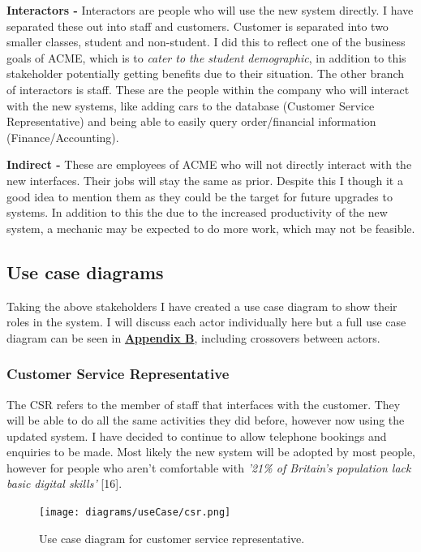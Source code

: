     \noindent\textbf{Interactors -} Interactors are people who will use the new system directly. I have separated these out into staff and customers.
    Customer is separated into two smaller classes, student and non-student. I did this to reflect one of the business goals of ACME, which is to \textit{
    cater to the student demographic}, in addition to this stakeholder potentially getting benefits due to their situation. The other branch of interactors
    is staff. These are the people within the company who will interact with the new systems, like adding cars to the database (Customer Service Representative)
    and being able to easily query order/financial information (Finance/Accounting).

    \vspace{0.2cm}

    \noindent\textbf{Indirect -} These are employees of ACME who will not directly interact with the new interfaces. Their jobs will stay the same as prior. Despite
    this I though it a good idea to mention them as they could be the target for future upgrades to systems. In addition to this the due to the increased 
    productivity of the new system, a mechanic may be expected to do more work, which may not be feasible.

  \subsection{Use case diagrams}
    Taking the above stakeholders I have created a use case diagram to show their roles in the system. I will discuss each actor individually here but a full
    use case diagram can be seen in \hyperref[sec:AppendixB]{\textbf{Appendix B}}, including crossovers between actors.

    \subsubsection{Customer Service Representative}
      The CSR refers to the member of staff that interfaces with the customer. They will be able to do all the same activities they did before, however now using
      the updated system. I have decided to continue to allow telephone bookings and enquiries to be made. Most likely the new system will be
      adopted by most people, however for people who aren't comfortable with \textit{'21\% of Britain's population lack basic digital
      skills'} [16].
      \begin{figure}[H]
        \centering
        \texttt{[image: diagrams/useCase/csr.png]}
        \caption{Use case diagram for customer service representative.}
        \label{fig:UCcsr}
      \end{figure}

